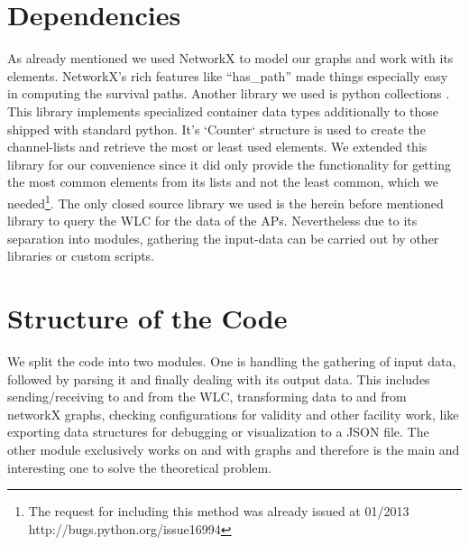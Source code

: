     \newpage
    
  \section{Dependencies}
    As already mentioned we used NetworkX \cite{hagberg-2008-exploring} to model our graphs and work with its elements.
    NetworkX's rich features like ``has\_path'' made things especially easy in computing the survival paths.
    Another library we used is python collections \cite{python_collections}.
    This library implements specialized container data types additionally to those shipped with standard python.
    It's `Counter` structure is used to create the channel-lists and retrieve the most or least used elements.
    We extended this library for our convenience since it did only provide the functionality for getting the most common elements from its lists and not the least common,
    which we needed\footnote{The request for including this method was already issued at 01/2013 http://bugs.python.org/issue16994}.
    The only closed source library we used is the herein before mentioned library to query the WLC for the data of the APs. 
    Nevertheless due to its separation into modules, gathering the input-data can be carried out by other libraries or custom scripts.
  
  \section{Structure of the Code}
    We split the code into two modules. One is handling the gathering of input data, followed by parsing it and finally dealing with its output data.
    This includes sending/receiving to and from the \ac{WLC}, transforming data to and from networkX graphs, checking configurations for validity and other facility work,
    like exporting data structures for debugging or visualization to a \ac{JSON} file.
    The other module exclusively works on and with graphs and therefore is the main and interesting one to solve the theoretical problem.
    
